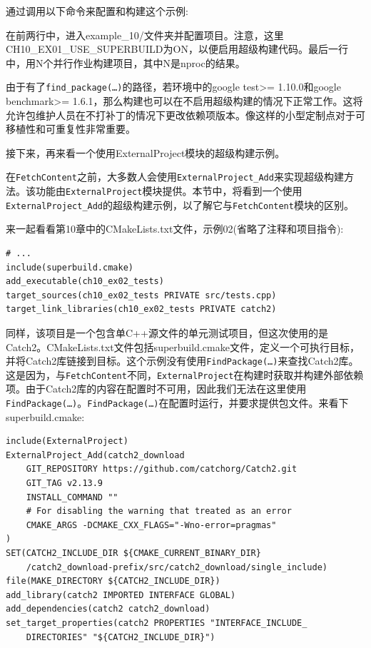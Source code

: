 通过调用以下命令来配置和构建这个示例:


在前两行中，进入example\_10/文件夹并配置项目。注意，这里CH10\_EX01\_USE\_SUPERBUILD为ON，以便启用超级构建代码。最后一行中，用N个并行作业构建项目，其中N是nproc的结果。

由于有了\texttt{find\_package(…)}的路径，若环境中的google test>= 1.10.0和google benchmark>= 1.6.1，那么构建也可以在不启用超级构建的情况下正常工作。这将允许包维护人员在不打补丁的情况下更改依赖项版本。像这样的小型定制点对于可移植性和可重复性非常重要。

接下来，再来看一个使用ExternalProject模块的超级构建示例。


在\texttt{FetchContent}之前，大多数人会使用\texttt{ExternalProject\_Add}来实现超级构建方法。该功能由\texttt{ExternalProject}模块提供。本节中，将看到一个使用\texttt{ExternalProject\_Add}的超级构建示例，以了解它与\texttt{FetchContent}模块的区别。

来一起看看第10章中的CMakeLists.txt文件，示例02(省略了注释和项目指令):

\begin{lstlisting}[style=styleCMake]
# ...
include(superbuild.cmake)
add_executable(ch10_ex02_tests)
target_sources(ch10_ex02_tests PRIVATE src/tests.cpp)
target_link_libraries(ch10_ex02_tests PRIVATE catch2)
\end{lstlisting}

同样，该项目是一个包含单C++源文件的单元测试项目，但这次使用的是Catch2。CMakeLists.txt文件包括superbuild.cmake文件，定义一个可执行目标，并将Catch2库链接到目标。这个示例没有使用\texttt{FindPackage(…)}来查找Catch2库。这是因为，与\texttt{FetchContent}不同，\texttt{ExternalProject}在构建时获取并构建外部依赖项。由于Catch2库的内容在配置时不可用，因此我们无法在这里使用\texttt{FindPackage(…)}。\texttt{FindPackage(…)}在配置时运行，并要求提供包文件。来看下superbuild.cmake:

\begin{lstlisting}[style=styleCMake]
include(ExternalProject)
ExternalProject_Add(catch2_download
	GIT_REPOSITORY https://github.com/catchorg/Catch2.git
	GIT_TAG v2.13.9
	INSTALL_COMMAND ""
	# For disabling the warning that treated as an error
	CMAKE_ARGS -DCMAKE_CXX_FLAGS="-Wno-error=pragmas"
)
SET(CATCH2_INCLUDE_DIR ${CMAKE_CURRENT_BINARY_DIR}
	/catch2_download-prefix/src/catch2_download/single_include)
file(MAKE_DIRECTORY ${CATCH2_INCLUDE_DIR})
add_library(catch2 IMPORTED INTERFACE GLOBAL)
add_dependencies(catch2 catch2_download)
set_target_properties(catch2 PROPERTIES "INTERFACE_INCLUDE_
	DIRECTORIES" "${CATCH2_INCLUDE_DIR}")
\end{lstlisting}

